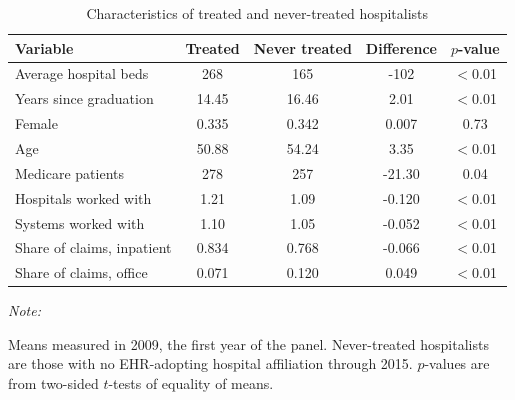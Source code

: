 \begin{table}[!h]
\centering
\caption{\label{tab:nt_chars}Characteristics of treated and never-treated hospitalists}
\centering
\begin{threeparttable}
\begin{tabular}[t]{lcccc}
\toprule
Variable & Treated & Never treated & Difference & $p$-value\\
\midrule
Average hospital beds & 268 & 165 & -102 & $<$0.01\\
Years since graduation & 14.45 & 16.46 & 2.01 & $<$0.01\\
Female & 0.335 & 0.342 & 0.007 & 0.73\\
Age & 50.88 & 54.24 & 3.35 & $<$0.01\\
Medicare patients & 278 & 257 & -21.30 & 0.04\\
\addlinespace
Hospitals worked with & 1.21 & 1.09 & -0.120 & $<$0.01\\
Systems worked with & 1.10 & 1.05 & -0.052 & $<$0.01\\
Share of claims, inpatient & 0.834 & 0.768 & -0.066 & $<$0.01\\
Share of claims, office & 0.071 & 0.120 & 0.049 & $<$0.01\\
\bottomrule
\end{tabular}
\begin{tablenotes}
\item \textit{Note: } 
\item Means measured in 2009, the first year of the panel. Never-treated hospitalists are those with no EHR-adopting hospital affiliation through 2015. $p$-values are from two-sided $t$-tests of equality of means.
\end{tablenotes}
\end{threeparttable}
\end{table}
